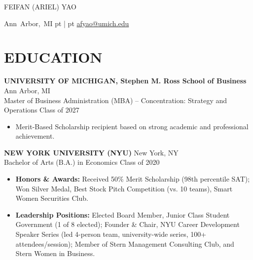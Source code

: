 \documentclass[9pt, letterpaper]{article}
\newenvironment{highlights}{
    \begin{itemize}[
        topsep=0.02cm,
        parsep=0.02cm,
        partopsep=0pt,
        itemsep=0pt,
        leftmargin=10pt
    ]
}{
    \end{itemize}
}
\newenvironment{header}{
    \setlength{\topsep}{0pt}\par\kern\topsep\centering\linespread{1.25}
}{
    \par\kern\topsep
}
\begin{document}
    \begin{header}
        \fontsize{14pt}{14pt}\selectfont FEIFAN (ARIEL) YAO

        \vspace{1pt}

        \normalsize
        \mbox{Ann Arbor, MI}%
         pt%
        |%
         pt%
        \mbox{\href{mailto:afyao@umich.edu}{afyao@umich.edu}}%
    \end{header}

    \vspace{-0.2cm}

    \section{EDUCATION}
    \noindent\textbf{UNIVERSITY OF MICHIGAN, Stephen M. Ross School of Business} \hfill Ann Arbor, MI \\
    Master of Business Administration (MBA) – Concentration: Strategy and Operations \hfill Class of 2027
    \begin{highlights}
        \item Merit-Based Scholarship recipient based on strong academic and professional achievement.
    \end{highlights}

    \vspace{0.1cm}

    \noindent\textbf{NEW YORK UNIVERSITY (NYU)} \hfill New York, NY \\
    Bachelor of Arts (B.A.) in Economics \hfill Class of 2020
    \begin{highlights}
        \item \textbf{Honors \& Awards:} Received 50\% Merit Scholarship (98th percentile SAT); Won Silver Medal, Best Stock Pitch Competition (vs. 10 teams), Smart Women Securities Club.
        \item \textbf{Leadership Positions:} Elected Board Member, Junior Class Student Government (1 of 8 elected); Founder \& Chair, NYU Career Development Speaker Series (led 4-person team, university-wide series, 100+ attendees/session); Member of Stern Management Consulting Club, and Stern Women in Business.
    \end{highlights}
\end{document}
